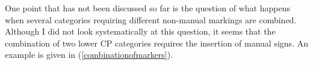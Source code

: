 \begin{exe}
\ex \label{ex:lowercp}
\end{exe}


%

One point that has not been discussed so far is the question of what happens when several categories requiring different non-manual markings are combined. Although I did not look systematically at this question, it seems that the combination of two lower CP categories requires the insertion of manual signs. An example is given in (\ref{combinationofmarkers}). 

